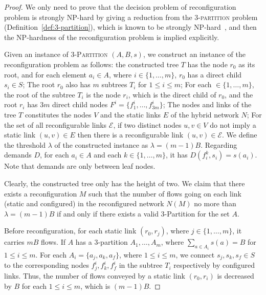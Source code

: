 \documentclass[sigconf]{acmart}
\newcommand{\E}{\mathcal{E}}  %
\begin{document}
\begin{proof}
We only need to prove that the decision problem of reconfiguration problem is strongly NP-hard by giving a reduction from the \textsc{$3$-partition} problem (Definition~\ref{def:3-partition}), which is known to be strongly NP-hard~\cite{Garey:1979:CIG:578533}, and then the NP-hardness of the reconfiguration problem is implied explicitly. 

 Given an instance of \textsc{$3$-Partition} $(A, B, s)$, we construct an instance of the reconfiguration problem as follows: the constructed tree $T$  has the node $r_0$ as its root, and for each element $a_i\in A$, where $i\in\{1,\ldots,m\}$, $r_0$ has a direct child $s_i\in S$; The root $r_0$ also has $m$ subtrees $T_i$ for $1\leq i\leq m$; For each  $\in \{1,\ldots,m\}$, the root of the subtree $T_i$ is the node $r_i$, which is the direct child of $r_0$, and the root $r_i$ has $3m$ direct child nodes $F^i=\{f^i_1,\ldots, f^i_{3m}\}$; The nodes and links of the tree $T$ constitutes the nodes $V$ and the static links $E$ of the hybrid network $N$; For the set of all reconfigurable links $\E$, if two distinct nodes $u,v\in V$ do not imply a static link $(u,v)\in E$ then there is a reconfigurable link $(u,v)\in \E$. We define the threshold $\lambda$ of the constructed instance as $\lambda=(m-1)B$. Regarding demands $D$, for each $a_i\in A$ and each $k\in \{1,\ldots,m\}$, it has $D(f^k_i,s_i)=s(a_i)$. Note that demands are only between leaf nodes.
 
Clearly, the constructed tree only has the height of two. We claim that there exists a reconfiguration $M$ such that the number of flows going on each link (static and configured) in the reconfigured network $N(M)$ no more than $\lambda=(m-1)B$  if and only if there exists a valid $3$-Partition for the set $A$.
	
Before reconfiguration,  for each static link $(r_0,r_j)$, where $j\in \{1,\ldots,m\}$, it carries $mB$ flows. If $A$ has a $3$-partition $A_1,\ldots, A_m$, where $\sum_{a\in A_i} s(a)= B$ for $1\leq i\leq m$. For each $A_i=\{a_j,a_k,a_f\}$, where $1\leq i\leq m$, we connect $s_j,s_k,s_f\in S$ to the corresponding nodes $f^i_j,f^i_k,f^i_f$ in the subtree $T_i$ respectively by configured links. Thus,  the number of flows conveyed by a  static link $(r_0,r_i)$ is decreased by $B$ for each $1\leq i\leq m$, which is $(m-1)B$.


\end{proof}
\end{document}
